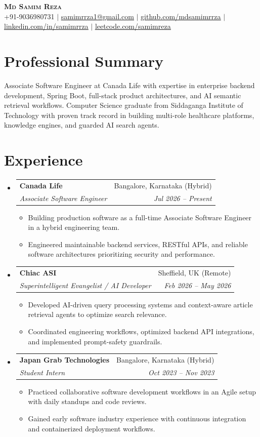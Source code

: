 \documentclass[letterpaper,11pt]{article}
\makeatletter
\newcommand{\resumeItem}[1]{
  \item\small{
    {#1 \vspace{-2pt}}
  }
}
\newcommand{\resumeSubheading}[4]{
  \vspace{-2pt}\item
    \begin{tabular*}{0.97\textwidth}[t]{l@{\extracolsep{\fill}}r}
      \textbf{#1} & #2 \\
      \textit{\small#3} & \textit{\small #4} \\
    \end{tabular*}\vspace{-7pt}
}
\newcommand{\resumeSubHeadingListStart}{\begin{itemize}[leftmargin=0.15in, label={}]}
\newcommand{\resumeSubHeadingListEnd}{\end{itemize}}
\newcommand{\resumeItemListStart}{\begin{itemize}}
\newcommand{\resumeItemListEnd}{\end{itemize}\vspace{-5pt}}
\makeatother
\begin{document}
\begin{center}
    \textbf{\Huge \scshape Md Samim Reza} \\ \vspace{4pt}
    \small +91-9036980731 $|$
    \href{mailto:samimrrza1@gmail.com}{\underline{samimrrza1@gmail.com}} $|$
    \href{https://github.com/mdsamimrrza}{\underline{github.com/mdsamimrrza}} $|$
    \href{https://linkedin.com/in/samimrrza}{\underline{linkedin.com/in/samimrrza}} $|$
    \href{https://leetcode.com/samimreza}{\underline{leetcode.com/samimreza}}
\end{center}

\section{Professional Summary}
\small{
Associate Software Engineer at Canada Life with expertise in enterprise backend development, Spring Boot, full-stack product architectures, and AI semantic retrieval workflows. Computer Science graduate from Siddaganga Institute of Technology with proven track record in building multi-role healthcare platforms, knowledge engines, and guarded AI search agents.
}

\section{Experience}
  \resumeSubHeadingListStart
    \resumeSubheading
      {Canada Life}{Bangalore, Karnataka (Hybrid)}
      {Associate Software Engineer}{Jul 2026 -- Present}
      \resumeItemListStart
        \resumeItem{Building production software as a full-time Associate Software Engineer in a hybrid engineering team.}
        \resumeItem{Engineered maintainable backend services, RESTful APIs, and reliable software architectures prioritizing security and performance.}
      \resumeItemListEnd

    \resumeSubheading
      {Chiac ASI}{Sheffield, UK (Remote)}
      {Superintelligent Evangelist / AI Developer}{Feb 2026 -- May 2026}
      \resumeItemListStart
        \resumeItem{Developed AI-driven query processing systems and context-aware article retrieval agents to optimize search relevance.}
        \resumeItem{Coordinated engineering workflows, optimized backend API integrations, and implemented prompt-safety guardrails.}
      \resumeItemListEnd

    \resumeSubheading
      {Japan Grab Technologies}{Bangalore, Karnataka (Hybrid)}
      {Student Intern}{Oct 2023 -- Nov 2023}
      \resumeItemListStart
        \resumeItem{Practiced collaborative software development workflows in an Agile setup with daily standups and code reviews.}
        \resumeItem{Gained early software industry experience with continuous integration and containerized deployment workflows.}
      \resumeItemListEnd
  \resumeSubHeadingListEnd
\end{document}
